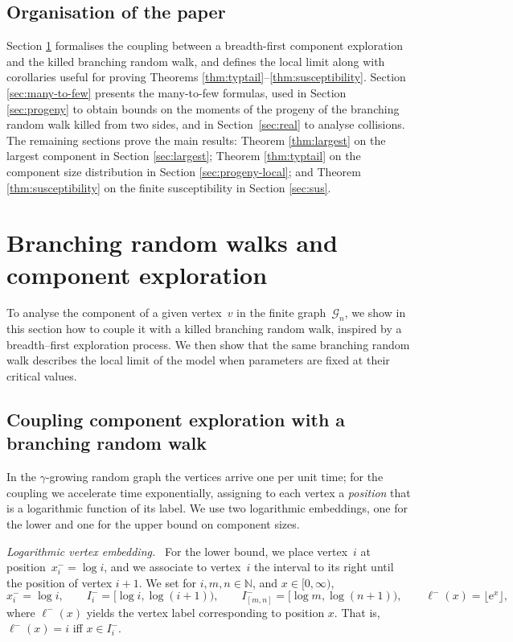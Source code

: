 \documentclass[a4paper, a4wide, 10pt, reqno]{amsart}
\theoremstyle{plain}
\theoremstyle{definition}
\numberwithin{equation}{section}
\newcommand{\N}{{\mathbb N}}
\newcommand{\sG}{{\mathscr G}}
\newcommand{\re}{{\mathrm e}}
\begin{document}
\subsection*{Organisation of the paper} Section \ref{sec:components} formalises the coupling between a breadth-first component exploration and the killed branching random walk, and defines the local limit along with corollaries useful for proving Theorems \ref{thm:typtail}--\ref{thm:susceptibility}.  Section \ref{sec:many-to-few} presents the many-to-few formulas,  used in Section \ref{sec:progeny} to obtain bounds on the moments of the progeny of the branching random walk killed from two sides, and in Section~\ref{sec:real} to analyse collisions. The remaining sections prove the main results: Theorem \ref{thm:largest} on the largest component in Section \ref{sec:largest}; Theorem \ref{thm:typtail} on the component size distribution in Section \ref{sec:progeny-local}; and Theorem \ref{thm:susceptibility} on the finite susceptibility in Section \ref{sec:sus}.

\section{Branching random walks and component exploration}\label{sec:components}
To analyse the component of a given vertex~$v$ in the finite graph~$\sG_n$, we show in this section how to couple it with a killed branching random walk, inspired by a breadth–first exploration process. We then show that the same branching random walk describes the local limit of the model when parameters are fixed at their critical values.

\subsection{Coupling component exploration with a branching random walk}\label{sec:bfe}
In the $\gamma$-growing random graph the vertices arrive one per unit time; for the coupling we accelerate time exponentially, assigning to each vertex a \emph{position} that is a logarithmic function of its label.   We use two logarithmic embeddings, one for the lower and one for the upper bound on component sizes.

\smallskip\noindent\emph{Logarithmic vertex embedding.\ }
For the lower bound, we place vertex~$i$ at position~$x_i^-=\log i$, and  we associate to vertex~$i$ the interval to its right until the position of vertex $i+1$. We set for $i,m,n\in\N$, and $x\in[0,\infty)$,
\begin{equation}\label{eq:i-lower}
	x_i^-=\log i, \qquad I_i^-=\big[\log i,\log(i+1)\big),\qquad 
	I^-_{[m,n]}=\big[\log m,\log(n+1)\big), \qquad \ell^-(x)=\lfloor \re^x\rfloor,
\end{equation}
where $\ell^-(x)$ yields the vertex label corresponding to position $x$. That is, $\ell^-(x)=i$ iff $x\in I_i^-$. 
\end{document}
